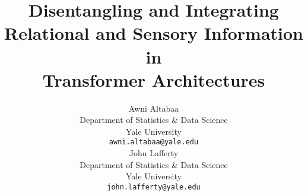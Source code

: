 \documentclass{article}
\title{Disentangling and Integrating \\Relational and Sensory Information in \\Transformer Architectures}
\author{%
  Awni Altabaa\\ %
  Department of Statistics \& Data Science\\
  Yale University\\
  \texttt{awni.altabaa@yale.edu} \\
  \And
  John Lafferty \\
  Department of Statistics \& Data Science \\
  Yale University \\
  \texttt{john.lafferty@yale.edu}
}
\begin{document}
\maketitle




















\printbibliography


\listoffixmes

\clearpage
\newpage


\appendix









% 
\end{document}
